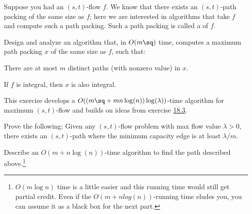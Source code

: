 \documentclass{article}
\begin{document}
 Suppose you had an \( (s, t) \)-flow \( f \). \label{ex:18.3}
We know that there exists an \( (s,t) \)-path packing of the same size as \( f \); here we are interested in algorithms that take \( f \) and compute such a path packing.
Such a path packing is called a  of \( f \).

Design and analyze an algorithm that, in \( O(m\sq) \) time, computes a maximum path packing \( x \) of the same size as \( f \), such that:
\setcounter{section}{18}
\setcounter{exercise}{3}
\begin{subexercise}
  There are at most \( m \) distinct paths (with nonzero value) in \( x \).
\end{subexercise}

\begin{solution}

\end{solution}
\pagebreak

\begin{subexercise}
  If \( f \) is integral, then \( x \) is also integral.
\end{subexercise}

\begin{solution}

\end{solution}
\pagebreak

 This exercise develops a \( O((m\sq + mn\log(n))\log(\lambda)) \)-time algorithm for maximum \( (s,t) \)-flow and builds on ideas from exercise \hyperref[ex:18.3]{18.3}.

\begin{subexercise}
  Prove the following: Given any \( (s, t) \)-flow problem with max flow value \( \lambda > 0 \), there exists an \( (s, t) \)-path where the minimum capacity edge is at least \( \lambda/m \).
\end{subexercise}

\begin{solution}

\end{solution}
\pagebreak

\begin{subexercise}
  Describe an \( O(m+n\log(n)) \)-time algorithm to find the path described above.\footnote[number]{\( O(m\log n) \) time is a little easier and this running time would still get partial credit.
    Even if the \( O(m + n log(n)) \)-running time eludes you, you can assume it as a black box for the next part.}
\end{subexercise}
\end{document}
